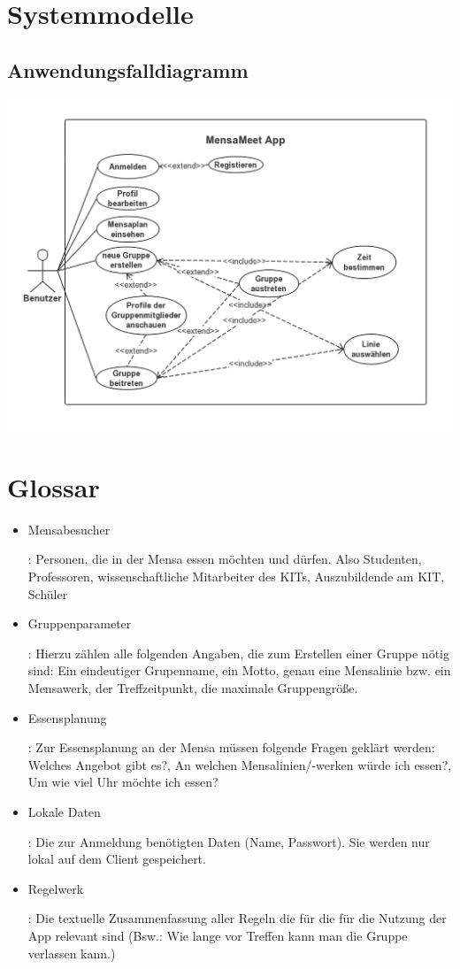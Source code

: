\documentclass[a4paper]{scrreprt}
\begin{document}
\chapter{Systemmodelle}
\section{Anwendungsfalldiagramm}	

\begin{center}
	\includegraphics[scale=0.5]{useCase_MensaMeet.jpg}
\end{center}

\chapter{Glossar}
 \begin{itemize}
 \item \hypertarget{label1}{Mensabesucher}: Personen, die in der Mensa essen möchten und dürfen. Also Studenten, Professoren, wissenschaftliche Mitarbeiter des KITs, Auszubildende am KIT, Schüler
 \item \hypertarget{label2}{Gruppenparameter}: Hierzu zählen alle folgenden Angaben, die zum Erstellen einer Gruppe nötig sind: Ein eindeutiger Grupenname, ein Motto, genau eine Mensalinie bzw. ein Mensawerk, der Treffzeitpunkt, die maximale Gruppengröße.
\item \hypertarget{label3}{Essensplanung}: Zur Essensplanung an der Mensa müssen folgende Fragen geklärt werden: Welches Angebot gibt es?, An welchen Mensalinien/-werken würde ich essen?, Um wie viel Uhr möchte ich essen? 
\item \hypertarget{label4}{Lokale Daten}: Die zur Anmeldung benötigten Daten (Name, Passwort). Sie werden nur lokal auf dem Client gespeichert.
\item \hypertarget{label5}{Regelwerk}: Die textuelle Zusammenfassung aller Regeln die für die für die Nutzung der App relevant sind (Bsw.: Wie lange vor Treffen kann man die Gruppe verlassen kann.)

  
 \end{itemize}
 
\end{document}
